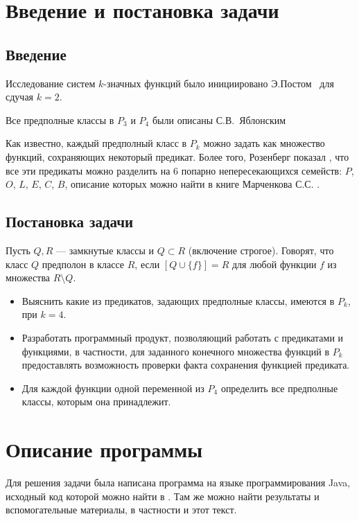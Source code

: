 \documentclass[a4paper,14pt]{extreport}
\begin{document}
\newpage
\tableofcontents
\newpage
\chapter{ Введение и постановка задачи }

\section{Введение}
Исследование систем $k$-значных функций было инициировано Э.Постом~\cite{post1,post2} для сдучая $k=2$.

Все предполные классы в $P_3$ и $P_4$ были описаны С.В.~Яблонским\cite{yabl}

Как известно, каждый предполный класс в $P_k$ можно задать как множество функций, сохраняющих некоторый предикат. Более того, Розенберг показал \cite{roz1, roz2}, что все эти предикаты можно разделить на 6 попарно непересекающихся семейств: $P$, $O$, $L$, $E$, $C$, $B$, описание которых можно найти в книге Марченкова С.С. \cite{march}. 

\section{Постановка задачи}
Пусть $Q, R$ — замкнутые классы и $Q \subset R$ (включение строгое). 
Говорят, что класс $Q$ предполон в классе $R$, если $[Q \cup \{f\}] = R$ для 
любой функции $f$ из множества $R \setminus Q$. 

\begin{itemize}
\item Выяснить какие из предикатов, задающих предполные классы, имеются в $P_k$, при $k=4$.
\item Разработать программный продукт, позволяющий работать с предикатами и функциями, в частности, для заданного конечного множества функций в $P_k$ предоставлять возможность проверки факта сохранения функцией предиката.
\item Для каждой функции одной переменной из $P_4$ определить все предполные классы, которым она принадлежит.
\end{itemize}
 
\newpage
\chapter{Описание программы}
Для решения задачи была написана программа на языке программирования Java, исходный код которой можно найти в \cite{git}. Там же можно найти результаты и вспомогательные материалы, в частности и этот текст.
\end{document}
